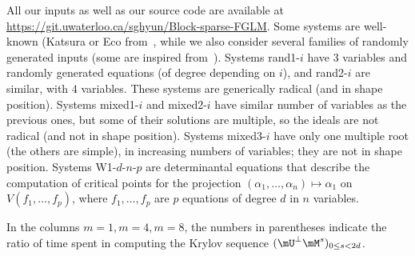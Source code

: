 \documentclass[12pt]{article}
\begin{document}
All our inputs as well as our source code are available at
\url{https://git.uwaterloo.ca/sghyun/Block-sparse-FGLM}. Some systems
are well-known (Katsura or Eco from~\cite{Morgan88}, while we also
consider several families of randomly generated inputs (some are
inspired from~\cite{FaMo17}). Systems rand1-$i$ have $3$ variables and
randomly generated equations (of degree depending on $i$), and
rand2-$i$ are similar, with $4$ variables. These systems are
generically radical (and in shape position). Systems mixed1-$i$ and
mixed2-$i$ have similar number of variables as the previous ones, but some of their
solutions are multiple, so the ideals are not radical (and not in
shape position). Systems mixed3-$i$ have only one multiple root (the
others are simple), in increasing numbers of variables; they are not
in shape position. Systems W1-$d$-$n$-$p$ are determinantal equations
that describe the computation of critical points for the projection
$ (\alpha_1,\dots,\alpha_n) \mapsto \alpha_1$ on
$V(f_1,\dots,f_p)$, where $f_1,\dots,f_p$ are $p$ equations of degree
$d$ in $n$ variables.

In the columns $m=1,m=4,m=8$, the numbers in parentheses indicate the
ratio of time spent in computing the Krylov sequence $(\mU^{\perp}
\mM^s)_{0 \le s< 2d}$.
\end{document}
